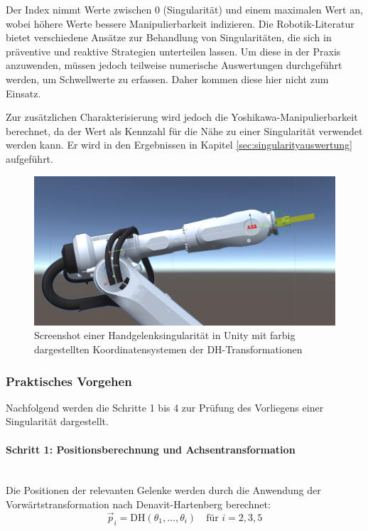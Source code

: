 Der Index nimmt Werte zwischen 0 (Singularität) und einem maximalen Wert an,
wobei höhere Werte bessere Manipulierbarkeit indizieren. Die Robotik-Literatur
bietet verschiedene Ansätze zur Behandlung von Singularitäten, die sich in
präventive und reaktive Strategien unterteilen lassen. Um diese in der Praxis
anzuwenden, müssen jedoch teilweise numerische Auswertungen durchgeführt werden,
um Schwellwerte zu erfassen. Daher kommen diese hier nicht zum Einsatz.

Zur zusätzlichen Charakterisierung wird jedoch die Yoshikawa-Manipulierbarkeit
berechnet, da der Wert als Kennzahl für die Nähe zu einer Singularität verwendet
werden kann. Er wird in den Ergebnissen in Kapitel
\ref{sec:singularityauswertung} aufgeführt.

\begin{figure}[H]
  \centering
  \includegraphics[width=\linewidth]{Figures/wristSingularityScreenshot.jpg}
  \caption{Screenshot einer Handgelenksingularität in Unity mit farbig
  dargestellten Koordinatensystemen der DH-Transformationen}
  \label{figure:wristSingularity}
\end{figure}

\subsubsection{Praktisches Vorgehen} \label{sssec:Framework_Implementierung}
Nachfolgend werden die Schritte 1 bis 4 zur Prüfung des Vorliegens
einer Singularität dargestellt.

\paragraph{Schritt 1: Positionsberechnung und Achsentransformation}~\\
Die Positionen der relevanten Gelenke werden durch die Anwendung der
Vorwärtstransformation nach Denavit-Hartenberg berechnet:
\begin{equation}
  \vec{p}_i = \text{DH}(\theta_1, \ldots, \theta_i) \quad \text{für }
  i = 2, 3, 5
  \label{eq:position_calculation}
\end{equation}
 
